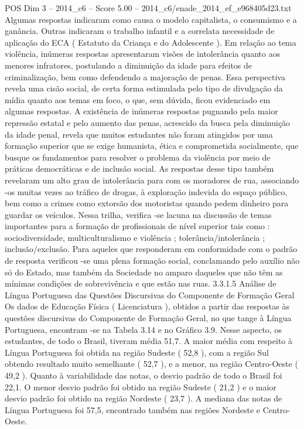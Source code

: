 \begin{textsample}{POS Dim 3 – 2014\_c6 – Score 5.00 – 2014\_c6/enade\_2014\_ef\_e968405d23.txt}
Algumas respostas indicaram como causa o modelo capitalista, o consumismo e a ganância.
Outras indicaram o trabalho infantil e a correlata necessidade de aplicação do ECA ( Estatuto da Criança e do Adolescente ).
Em relação ao tema violência, inúmeras respostas apresentaram visões de intolerância quanto aos menores infratores, postulando a diminuição da idade para efeitos de criminalização, bem como defendendo a majoração de penas.
Essa perspectiva revela uma cisão social, de certa forma estimulada pelo tipo de divulgação da mídia quanto aos temas em foco, o que, sem dúvida, ficou evidenciado em algumas respostas.
A existência de inúmeras respostas pugnando pela maior repressão estatal e pelo aumento das penas, acrescido da busca pela diminuição da idade penal, revela que muitos estudantes não foram atingidos por uma formação superior que se exige humanista, ética e comprometida socialmente, que busque os fundamentos para resolver o problema da violência por meio de práticas democráticas e de inclusão social.
As respostas desse tipo também revelaram um alto grau de intolerância para com os moradores de rua, associando -os muitas vezes ao tráfico de drogas, à exploração indevida do espaço público, bem como a crimes como extorsão dos motoristas quando pedem dinheiro para guardar os veículos.
Nessa trilha, verifica -se lacuna na discussão de temas importantes para a formação de profissionais de nível superior tais como : sociodiversidade, multiculturalismo e violência ; tolerância/intolerância ; inclusão/exclusão.
Para aqueles que responderam em conformidade com o padrão de resposta verificou -se uma plena formação social, conclamando pelo auxílio não só do Estado, mas também da Sociedade no amparo daqueles que não têm as mínimas condições de sobrevivência e que estão nas ruas. 3.3.1.5 Análise de Língua Portuguesa das Questões Discursivas do Componente de Formação Geral Os dados de Educação Física ( Licenciatura ), obtidos a partir das respostas às questões discursivas do Componente de Formação Geral, no que tange à Língua Portuguesa, encontram -se na Tabela 3.14 e no Gráfico 3.9.
Nesse aspecto, os estudantes, de todo o Brasil, tiveram média 51,7.
A maior média com respeito à Língua Portuguesa foi obtida na região Sudeste ( 52,8 ), com a região Sul obtendo resultado muito semelhante ( 52,7 ), e a menor, na região Centro-Oeste ( 49,2 ).
Quanto à variabilidade das notas, o desvio padrão de todo o Brasil foi 22,1.
O menor desvio padrão foi obtido na região Sudeste ( 21,2 ) e o maior desvio padrão foi obtido na região Nordeste ( 23,7 ).
A mediana das notas de Língua Portuguesa foi 57,5, encontrado também nas regiões Nordeste e Centro-Oeste.

\end{textsample}
